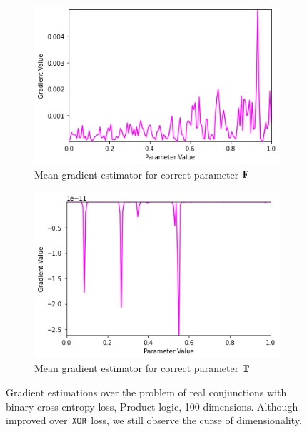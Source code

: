 \begin{figure}[h]
\begin{subfigure}[b]{0.47\textwidth}
        \includegraphics[width=\textwidth]{imgs/grad_prod_bce_falseparam_100dim_avg.png}
        \caption{Mean gradient estimator for correct parameter $\textbf{F}$}
        \label{fig:conjgrad100falseavgbce}
    \end{subfigure}
    \begin{subfigure}[b]{0.47\textwidth}
        \centering
        \includegraphics[width=\textwidth]{imgs/grad_prod_bce_trueparam_100dim_avg.png}
        \caption{Mean gradient estimator for correct parameter $\textbf{T}$}
        \label{fig:conjgrad100trueavgbce}
    \end{subfigure}
       \caption{Gradient estimations over the problem of real conjunctions with binary cross-entropy loss, Product logic, 100 dimensions. Although improved over $\texttt{XOR}$ loss, we still observe the curse of dimensionality.}
       \label{fig:conjgrad100bce}
\end{figure}

